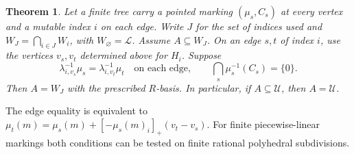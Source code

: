 \documentclass[11pt,reqno]{amsart}
\numberwithin{equation}{section}
\newtheorem{theorem}{Theorem}[section]
\theoremstyle{definition}
\theoremstyle{remark}
\begin{document}
\begin{theorem}\label{thm:finite-tree-recognition}
Let a finite tree carry a pointed marking \((\mu_s,C_s)\) at every
vertex and a mutable index \(i\) on each edge. Write \(J\) for the set
of indices used and \(W_J=\bigcap_{i\in J}W_i\), with \(W_\varnothing=\mathcal L\).
Assume \(A\subseteq W_J\). On an edge \(s,t\) of index \(i\), use the
vertices \(v_s,v_t\) determined above for \(H_i\). Suppose
\[ \lambda_{i,v_s}^{-1}\mu_s=\lambda_{i,v_t}^{-1}\mu_t \quad\text{on each edge},\qquad \bigcap_s\mu_s^{-1}(C_s)=\{0\}. \]
Then \(A=W_J\) with the prescribed \(R\)-basis. In particular, if
\(A\subseteq\mathcal U\), then \(A=\mathcal U\).
\end{theorem}

The edge equality is equivalent to
\(\mu_t(m)=\mu_s(m)+[-\mu_s(m)_i]_+(v_t-v_s)\).
For finite piecewise-linear markings both conditions can be tested
on finite rational polyhedral subdivisions.
\end{document}
